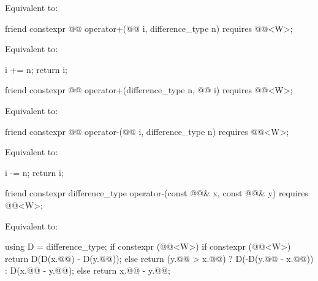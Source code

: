 \begin{itemdescr}
\pnum
\effects
Equivalent to: 
\end{itemdescr}

\begin{itemdecl}
friend constexpr @@ operator+(@@ i, difference_type n)
  requires @@<W>;
\end{itemdecl}

\begin{itemdescr}
\pnum
\effects
Equivalent to:
\begin{codeblock}
i += n;
return i;
\end{codeblock}
\end{itemdescr}

\begin{itemdecl}
friend constexpr @@ operator+(difference_type n, @@ i)
  requires @@<W>;
\end{itemdecl}

\begin{itemdescr}
\pnum
\effects
Equivalent to: 
\end{itemdescr}

\begin{itemdecl}
friend constexpr @@ operator-(@@ i, difference_type n)
  requires @@<W>;
\end{itemdecl}

\begin{itemdescr}
\pnum
\effects
Equivalent to:
\begin{codeblock}
i -= n;
return i;
\end{codeblock}
\end{itemdescr}

\begin{itemdecl}
friend constexpr difference_type operator-(const @@& x, const @@& y)
  requires @@<W>;
\end{itemdecl}

\begin{itemdescr}
\pnum
\effects
Equivalent to:
\begin{codeblock}
using D = difference_type;
if constexpr (@@<W>) {
  if constexpr (@@<W>)
    return D(D(x.@@) - D(y.@@));
  else
    return (y.@@ > x.@@)
      ? D(-D(y.@@ - x.@@))
      : D(x.@@ - y.@@);
} else {
  return x.@@ - y.@@;
}
\end{codeblock}
\end{itemdescr}

